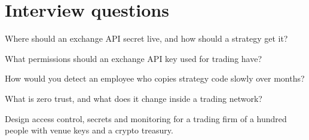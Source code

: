 \section{Interview questions}

\begin{interviewq}\label{iq:pl:security:1}
Where should an exchange API secret live, and how should a strategy get it?
\end{interviewq}

\begin{interviewq}\label{iq:pl:security:2}
What permissions should an exchange API key used for trading have?
\end{interviewq}

\begin{interviewq}\label{iq:pl:security:3}
How would you detect an employee who copies strategy code slowly over months?
\end{interviewq}

\begin{interviewq}\label{iq:pl:security:4}
What is zero trust, and what does it change inside a trading network?
\end{interviewq}

\begin{interviewq}\label{iq:pl:security:5}
Design access control, secrets and monitoring for a trading firm of a hundred people with venue keys and a crypto treasury.
\end{interviewq}
